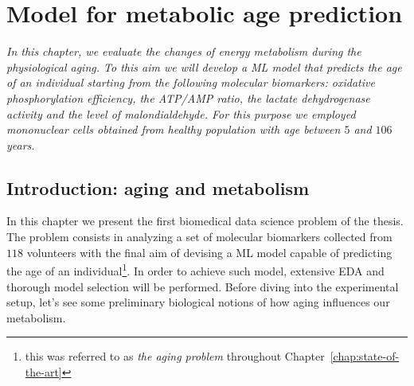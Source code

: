 
\chapter{Model for metabolic age prediction} \label{chap:frassoni}


\begin{displayquote}
	\textit{In this chapter, we evaluate the changes of energy metabolism during the physiological aging. To this aim we will develop a ML model that predicts the age of an individual starting from the following molecular biomarkers: oxidative phosphorylation efficiency, the \ac{ATP}/\ac{AMP} ratio, the lactate dehydrogenase activity and the level of malondialdehyde.  For this purpose we employed mononuclear cells obtained from healthy population with age between $5$ and $106$ years.}
\end{displayquote}

\section{Introduction: aging and metabolism} \label{sec:frassoni_intro}

In this chapter we present the first biomedical data science problem of the thesis. The problem consists in analyzing a set of molecular biomarkers collected from $118$ volunteers with the final aim of devising a ML model capable of predicting the age of an individual\footnote{this was referred to as \textit{the aging problem} throughout Chapter~\ref{chap:state-of-the-art}}. In order to achieve such model, extensive EDA  and thorough model selection will be performed.
Before diving into the experimental setup, let's see some preliminary biological notions of how aging influences our metabolism.

